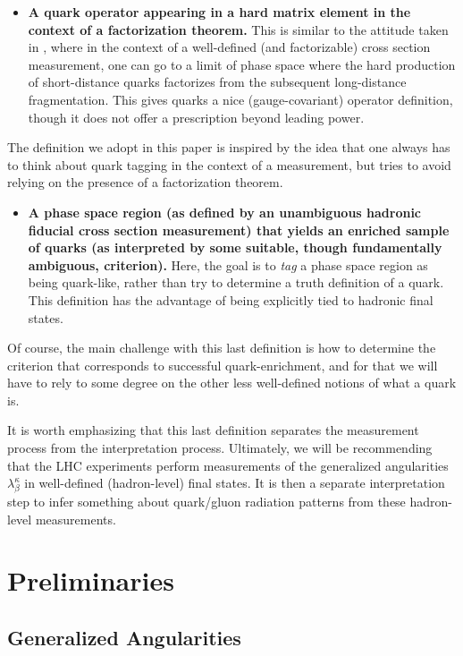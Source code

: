 \documentclass[11pt,letterpaper]{article}
\begin{document}
\begin{itemize}
\item \textbf{A quark operator appearing in a hard matrix element in the context of a factorization theorem.}  This is similar to the attitude taken in \cite{}, where in the context of a well-defined (and factorizable) cross section measurement, one can go to a limit of phase space where the hard production of short-distance quarks factorizes from the subsequent long-distance fragmentation.  This gives quarks a nice (gauge-covariant) operator definition, though it does not offer a prescription beyond leading power.
\end{itemize}
The definition we adopt in this paper is inspired by the idea that one always has to think about quark tagging in the context of a measurement, but tries to avoid relying on the presence of a factorization theorem.
\begin{itemize}
\item \textbf{A phase space region (as defined by an unambiguous hadronic fiducial cross section measurement) that yields an enriched sample of quarks (as interpreted by some suitable, though fundamentally ambiguous, criterion).}  Here, the goal is to \emph{tag} a phase space region as being quark-like, rather than try to determine a truth definition of a quark.  This definition has the advantage of being explicitly tied to hadronic final states.  
\end{itemize}  
Of course, the main challenge with this last definition is how to determine the criterion that corresponds to successful quark-enrichment, and for that we will have to rely to some degree on the other less well-defined notions of what a quark is.

It is worth emphasizing that this last definition separates the measurement process from the interpretation process.  Ultimately, we will be recommending that the LHC experiments perform measurements of the generalized angularities $\lambda_\beta^\kappa$ in well-defined (hadron-level) final states.  It is then a separate interpretation step to infer something about quark/gluon radiation patterns from these hadron-level measurements.

\section{Preliminaries}
\label{sec:prelim}

\subsection{Generalized Angularities}
\end{document}
